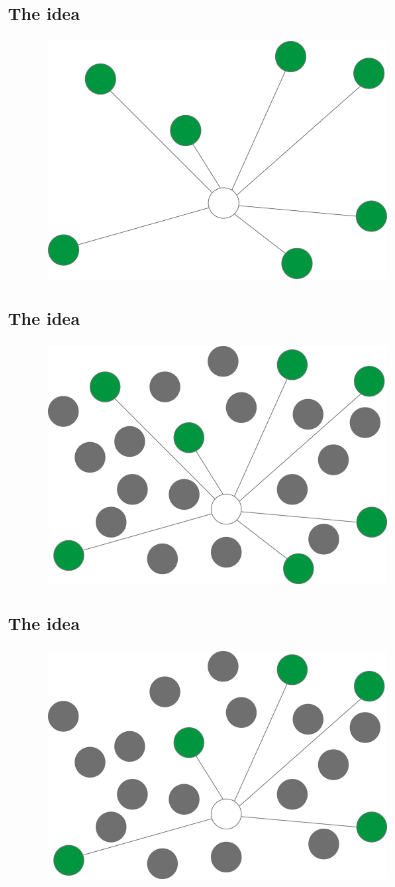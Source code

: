 \documentclass{beamer}
\begin{document}
\begin{frame}
\frametitle{The idea}

\begin{figure}
\includegraphics[keepaspectratio=true, width=0.8\textwidth]{images/old_pss.png}
\end{figure}
\end{frame}

\begin{frame}[noframenumbering]
\frametitle{The idea}

\begin{figure}
\includegraphics[keepaspectratio=true, width=0.8\textwidth]{images/new_pss_1.png}
\end{figure}
\end{frame}

\begin{frame}[noframenumbering]
\frametitle{The idea}

\begin{figure}
\includegraphics[keepaspectratio=true, width=0.8\textwidth]{images/new_pss_2.png}
\end{figure}
\end{frame}
\end{document}
